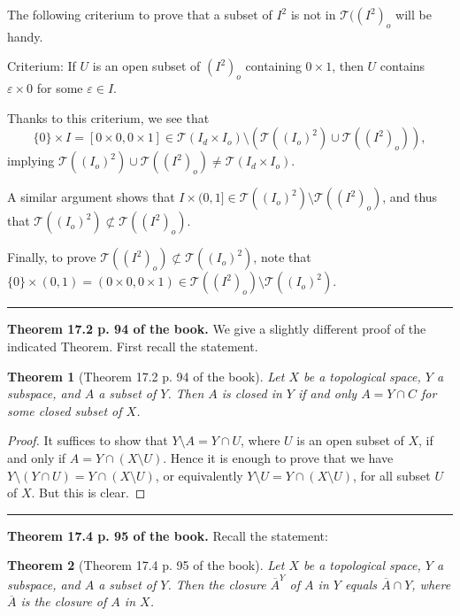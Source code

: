 \documentclass[12pt,letterpaper]{article}
\newtheorem{thm}{Theorem}%
\newcommand{\hs}{\bigskip\hrule\medskip}
\newcommand{\mc}{\mathcal}
\newcommand{\noi}{\noindent}%
\newcommand{\sm}{\setminus}
\begin{document}
The following criterium to prove that a subset of $I^2$ is not in $\mc T((I^2)_o$ will be handy. 

\noi Criterium: If $U$ is an open subset of $(I^2)_o$ containing $0\times1$, then $U$ contains $\varepsilon\times0$ for some $\varepsilon\in I$. 

Thanks to this criterium, we see that 
$$
\{0\}\times I=[0\times0,0\times1]\in\mc T(I_d\times I_o)\sm(\mc T((I_o)^2)\cup\mc T((I^2)_o)),
$$ 
implying $\mc T((I_o)^2)\cup\mc T((I^2)_o)\ne\mc T(I_d\times I_o)$. 

A similar argument shows that $I\times(0,1]\in\mc T((I_o)^2)\sm\mc T((I^2)_o)$, and thus that $\mc T((I_o)^2)\not\subset\mc T((I^2)_o)$.  

Finally, to prove $\mc T((I^2)_o)\not\subset\mc T((I_o)^2)$, note that $\{0\}\times(0,1)=(0\times0,0\times1)\in\mc T((I^2)_o)\sm\mc T((I_o)^2)$. 

\hs


\noi\textbf{Theorem 17.2 p. 94 of the book.} We give a slightly different proof of the indicated Theorem. First recall the statement. 

\begin{thm}[Theorem 17.2 p. 94 of the book]\label{T17.2} 
Let $X$ be a topological space, $Y$ a subspace, and $A$ a subset of $Y$. Then $A$ is closed in $Y$ if and only $A=Y\cap C$ for some closed subset of $X$. 
\end{thm} 

\begin{proof} 
It suffices to show that $Y\sm A=Y\cap U$, where $U$ is an open subset of $X$, if and only if $A=Y\cap(X\sm U)$. Hence it is enough to prove that we have $Y\sm(Y\cap U)=Y\cap(X\sm U)$, or equivalently $Y\sm U=Y\cap(X\sm U)$, for all subset $U$ of $X$. But this is clear. 
\end{proof}

\hrule\medskip

\noi\textbf{Theorem 17.4 p. 95 of the book.} Recall the statement: 

\begin{thm}[Theorem 17.4 p. 95 of the book] 
Let $X$ be a topological space, $Y$ a subspace, and $A$ a subset of $Y$. Then the closure $\overline A^Y$ of $A$ in $Y$ equals $\overline A\cap Y$, where $\overline A$ is the closure of $A$ in $X$.
\end{thm} 
\end{document}
